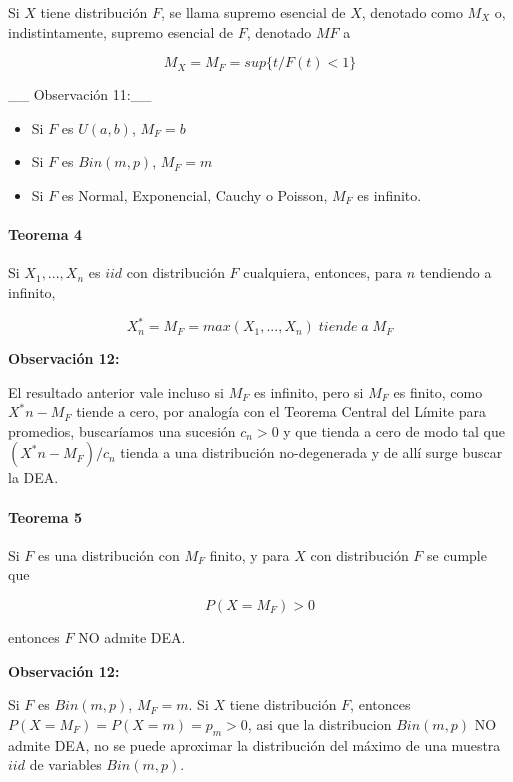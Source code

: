 \documentclass[
  oneside]{book}
\begin{document}
Si \(X\) tiene distribución \(F\), se llama supremo esencial de \(X\),
denotado como \(M_X\) o, indistintamente, supremo esencial de \(F\),
denotado \(MF\) a

\begin{equation}
M_X=M_F= sup\{t / F(t)<1\}\label{eq:Mx}
\end{equation}

\_\_ Observación 11:\_\_

\begin{itemize}
\item Si $F$ es $U(a,b)$, $M_F=b$
\item Si $F$ es $Bin(m,p)$, $M_F=m$
\item Si $F$ es Normal, Exponencial, Cauchy o Poisson, $M_F$ es infinito.
\end{itemize}

\hypertarget{teorema-4}{%
\paragraph{Teorema 4}\label{teorema-4}}

Si \(X_1,...,X_n\) es \(iid\) con distribución \(F\) cualquiera,
entonces, para \(n\) tendiendo a infinito,

\begin{equation}
X^*_n=M_F= max(X_1,...,X_n)\;tiende\;a\;M_F\label{eq:Xast}
\end{equation}

\textbf{Observación 12:}

El resultado anterior vale incluso si \(M_F\) es infinito, pero si
\(M_F\) es finito, como \(X^*n - M_F\) tiende a cero, por analogía con
el Teorema Central del Límite para promedios, buscaríamos una sucesión
\(c_n>0\) y que tienda a cero de modo tal que \((X^*n- M_F )/ c_n\)
tienda a una distribución no-degenerada y de allí surge buscar la DEA.

\hypertarget{teorema-5}{%
\paragraph{Teorema 5}\label{teorema-5}}

Si \(F\) es una distribución con \(M_F\) finito, y para \(X\) con
distribución \(F\) se cumple que

\[
P(X=M_F)>0 
\]

entonces \(F\) NO admite DEA.

\textbf{Observación 12:}

Si \(F\) es \(Bin(m,p)\), \(M_F=m\). Si \(X\) tiene distribución \(F\),
entonces \(P( X=M_F)= P( X=m)= p_m>0\), asi que la distribucion
\(Bin(m,p)\) NO admite DEA, no se puede aproximar la distribución del
máximo de una muestra \(iid\) de variables \(Bin(m,p)\).
\end{document}
